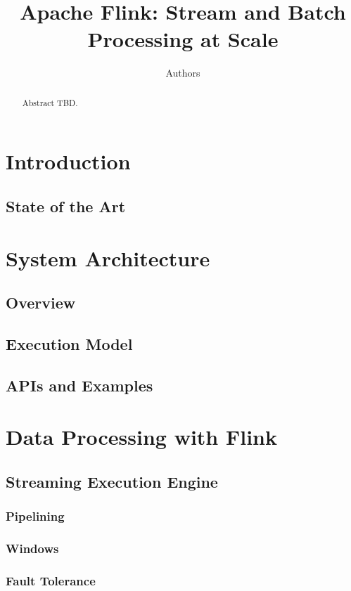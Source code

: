 \documentclass[11pt]{article}
\begin{document}
\title{Apache Flink: Stream and Batch Processing at Scale}
\author{Authors}

\maketitle

\begin{abstract}
Abstract TBD.
\end{abstract}

\section{Introduction}
\subsection{State of the Art}

\section{System Architecture}
	\subsection{Overview}
	\subsection{Execution Model}
	\subsection{APIs and Examples}

\section{Data Processing with Flink}
	\subsection{Streaming Execution Engine}
		\subsubsection{Pipelining}
		\subsubsection{Windows}
		\subsubsection{Fault Tolerance}
\end{document}
